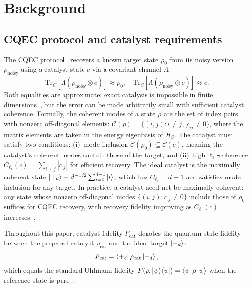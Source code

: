 \documentclass[prx,twocolumn,superscriptaddress,longbibliography,floatfix]{revtex4-2}
\begin{document}
\section{Background}
\label{sec:background}

\subsection{CQEC protocol and catalyst requirements}
\label{sec:cqec_review}

The CQEC protocol~\cite{Wakaura2026} recovers a known target state $\rho_0$ from its noisy version $\rho_\mathrm{noisy}$ using a catalyst state $c$ via a covariant channel $\Lambda$:
\begin{equation}
\mathrm{Tr}_C[\Lambda(\rho_\mathrm{noisy} \otimes c)] \approx \rho_0, \quad \mathrm{Tr}_S[\Lambda(\rho_\mathrm{noisy} \otimes c)] \approx c.
\label{eq:cqec}
\end{equation}
Both equalities are approximate: exact catalysis is impossible in finite dimensions~\cite{Shiraishi2024}, but the error can be made arbitrarily small with sufficient catalyst coherence.
Formally, the coherent modes of a state $\rho$ are the set of index pairs with nonzero off-diagonal elements: $\mathcal{C}(\rho) = \{(i,j) : i \neq j,\, \rho_{ij} \neq 0\}$, where the matrix elements are taken in the energy eigenbasis of $H_S$.
The catalyst must satisfy two conditions: (i)~mode inclusion $\mathcal{C}(\rho_0) \subseteq \mathcal{C}(c)$, meaning the catalyst's coherent modes contain those of the target, and (ii)~high $\ell_1$-coherence $C_{\ell_1}(c) = \sum_{i \neq j} |c_{ij}|$ for efficient recovery.
The ideal catalyst is the maximally coherent state $\ket{+_d} = d^{-1/2} \sum_{i=0}^{d-1} \ket{i}$, which has $C_{\ell_1} = d - 1$ and satisfies mode inclusion for any target.
In practice, a catalyst need not be maximally coherent: any state whose nonzero off-diagonal modes $\{(i,j) : c_{ij} \neq 0\}$ include those of $\rho_0$ suffices for CQEC recovery, with recovery fidelity improving as $C_{\ell_1}(c)$ increases~\cite{Wakaura2026}.

Throughout this paper, catalyst fidelity $F_\mathrm{cat}$ denotes the quantum state fidelity between the prepared catalyst $\rho_\mathrm{cat}$ and the ideal target $\ket{+_d}$:
\begin{equation}
F_\mathrm{cat} = \bra{+_d}\rho_\mathrm{cat}\ket{+_d},
\label{eq:fcat_def}
\end{equation}
which equals the standard Uhlmann fidelity $F(\rho, \ket{\psi}\!\bra{\psi}) = \bra{\psi}\rho\ket{\psi}$ when the reference state is pure~\cite{NielsenChuang2010}.
\end{document}

